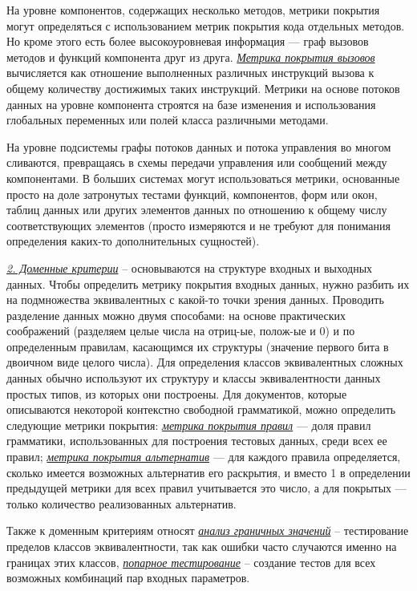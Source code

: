 На уровне компонентов, содержащих несколько методов, метрики покрытия могут определяться с использованием метрик покрытия кода отдельных методов. Но кроме этого есть более высокоуровневая информация — граф вызовов методов и функций компонента друг из друга. \underline{\textit{Метрика покрытия вызовов}} вычисляется как отношение выполненных различных инструкций вызова к общему количеству достижимых таких инструкций. Метрики на основе потоков данных на уровне компонента строятся на базе изменения и использования глобальных переменных или полей класса различными методами.

На уровне подсистемы графы потоков данных и потока управления во многом сливаются, превращаясь в схемы передачи управления или сообщений между компонентами. В больших системах могут использоваться метрики, основанные просто на доле затронутых тестами функций, компонентов, форм или окон, таблиц данных или других элементов данных по отношению к общему числу соответствующих элементов (просто измеряются и не требуют для понимания определения каких-то дополнительных сущностей).

\underline{\textit{2. Доменные критерии}} -- основываются на структуре входных и выходных данных. Чтобы определить метрику покрытия входных данных, нужно разбить их на подмножества эквивалентных с какой-то точки зрения данных. Проводить разделение данных можно двумя способами: на основе практических соображений (разделяем целые числа на отриц-ые, полож-ые и 0) и по определенным правилам, касающимся их структуры (значение первого бита в двоичном виде целого числа). Для определения классов эквивалентных сложных данных обычно используют их структуру и классы эквивалентности данных простых типов, из которых они построены. Для документов, которые описываются некоторой контекстно свободной грамматикой, можно определить следующие метрики покрытия: \underline{\textit{метрика покрытия правил}} — доля правил грамматики, использованных для построения тестовых данных, среди всех ее правил; \underline{\textit{метрика покрытия альтернатив}} — для каждого правила определяется, сколько имеется возможных альтернатив его раскрытия, и вместо 1 в определении предыдущей метрики для всех правил учитывается это число, а для покрытых — только количество реализованных альтернатив.

Также к доменным критериям относят \underline{\textit{анализ граничных значений}} -- тестирование пределов классов эквивалентности, так как ошибки часто случаются именно на границах этих классов, \underline{\textit{попарное тестирование}} -- создание тестов для всех возможных комбинаций пар входных параметров.

